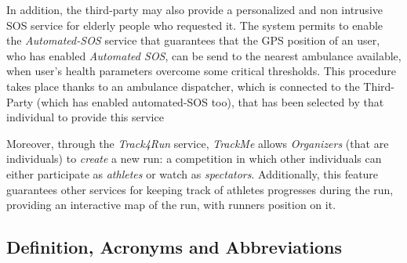 \documentclass[a4paper]{article}
\begin{document}
   
   
   In addition, the third-party may also provide a personalized and non intrusive SOS service for elderly people who requested it.
   The system permits to enable the \textit{Automated-SOS} service that guarantees that the GPS position of an user, who has enabled \textit{Automated SOS}, can be send to the nearest ambulance available, when user's health parameters overcome some critical thresholds. This procedure takes place thanks to an ambulance dispatcher, which is connected to the Third-Party (which has enabled automated-SOS too), that has been selected by that individual to provide this service
   
   
   
   Moreover,  through  the \textit{Track4Run} service, \textit{TrackMe} allows \textit{Organizers} (that are individuals)  to  \textit{create}  a  new  run:  a  competition  in  which other individuals can either participate as \textit{athletes} or watch as \textit{spectators}.  Additionally, this feature guarantees other services for keeping track of athletes progresses during the run, providing an interactive map of the run, with runners position on it.

\subsection{Definition, Acronyms and  Abbreviations}
           
\end{document}
